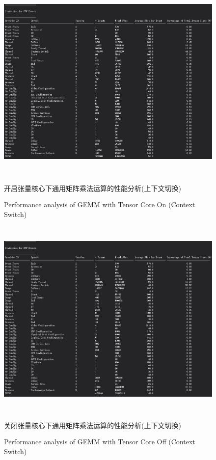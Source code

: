 \begin{figure}
	\centering
	\includegraphics[width=15cm,height=10cm]{figures/GEMMSIGHTTF.jpg}
	\renewcommand{\thefigure}{\arabic{section}-\arabic{figure} }
	\renewcommand{\figurename}{图}
	\caption{开启张量核心下通用矩阵乘法运算的性能分析(上下文切换)}
	\addtocounter{figure}{-1}
	\renewcommand{\thefigure}{\arabic{section}-\arabic{figure} }
	\renewcommand{\figurename}{Figure}
	\caption{Performance analysis of GEMM with Tensor Core On (Context Switch)}
	\label{Fig.GEMMSIGHTTF}
\end{figure}
\begin{figure}
	\centering
	\includegraphics[width=15cm,height=10cm]{figures/GEMMSIGHTNOTF.jpg}
	\renewcommand{\thefigure}{\arabic{section}-\arabic{figure} }
	\renewcommand{\figurename}{图}
	\caption{关闭张量核心下通用矩阵乘法运算的性能分析(上下文切换)}
	\addtocounter{figure}{-1}
	\renewcommand{\thefigure}{\arabic{section}-\arabic{figure} }
	\renewcommand{\figurename}{Figure}
	\caption{Performance analysis of GEMM with Tensor Core Off (Context Switch)}
	\label{Fig.GEMMSIGHTNOTF}
\end{figure}
